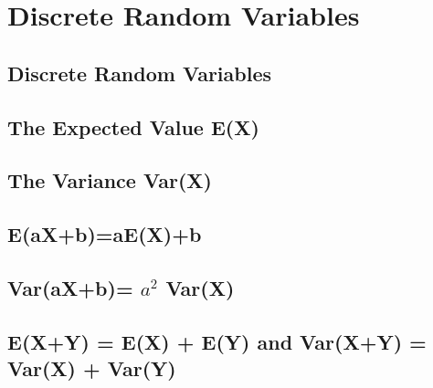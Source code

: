 \documentclass[../maths.tex]{subfiles}
\begin{document}
\chapter{Discrete Random Variables}
\section{Discrete Random Variables}
\section{The Expected Value E(X)}
\section{The Variance Var(X)}
\section{E(aX+b)=aE(X)+b}
\section{Var(aX+b)= \texorpdfstring{$a^2$}{a squared} Var(X)}
\section{E(X+Y) = E(X) + E(Y) and Var(X+Y) = Var(X) + Var(Y)}
\end{document}
